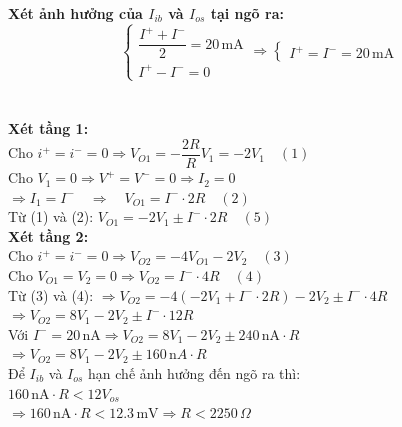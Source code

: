 \begin{flushleft}
\textbf{Xét ảnh hưởng của $I_{ib}$ và $I_{os}$ tại ngõ ra:} \\[8pt]
\[
\begin{cases}
\dfrac{I^+ + I^-}{2} = 20\,\text{mA} \\[6pt]
I^+ - I^- = 0
\end{cases}
\Rightarrow
\begin{cases}
I^+ = I^- = 20\,\text{mA}
\end{cases}
\]
\\[8pt]

  \\
\textbf{Xét tầng 1:} \\[4pt]
Cho $i^+ = i^- = 0 \Rightarrow V_{O1} = -\dfrac{2R}{R}V_1 = -2V_1 \quad (1)$ \\[6pt]
Cho $V_1 = 0 \Rightarrow V^+ = V^- = 0 \Rightarrow I_2 = 0$ \\[4pt]
$\Rightarrow I_1 = I^- \quad \Rightarrow \quad V_{O1} = I^- \cdot 2R \quad (2)$ \\[6pt]
Từ (1) và (2): $V_{O1} = -2V_1 \pm I^- \cdot 2R \quad (5)$ \\[10pt]

\textbf{Xét tầng 2:} \\[4pt]
Cho $i^+ = i^- = 0 \Rightarrow V_{O2} = -4V_{O1} - 2V_2 \quad (3)$ \\[6pt]
Cho $V_{O1} = V_2 = 0 \Rightarrow V_{O2} = I^- \cdot 4R \quad (4)$ \\[6pt]
Từ (3) và (4): $ \Rightarrow V_{O2} = -4(-2V_1 + I^- \cdot 2R) - 2V_2 \pm I^- \cdot 4R$ \\[4pt]

$\Rightarrow V_{O2} = 8V_1 - 2V_2 \pm I^- \cdot 12R$ \\[8pt]

Với $I^- = 20\,\text{nA} \Rightarrow V_{O2} = 8V_1 - 2V_2 \pm 240\,\text{nA}\cdot R$ \\[8pt]
$\Rightarrow V_{O2} = 8V_1 - 2V_2 \pm 160\,\text{n}\!A \cdot R$ \\[10pt]

Để $I_{ib}$ và $I_{os}$ hạn chế ảnh hưởng đến ngõ ra thì: \\[4pt]
$160\,\text{nA} \cdot R < 12V_{os}$ \\[4pt]
$\Rightarrow 160\,\text{nA} \cdot R < 12.3\,\text{mV} \Rightarrow R < 2250\,\Omega$ \\[10pt]

\end{flushleft}